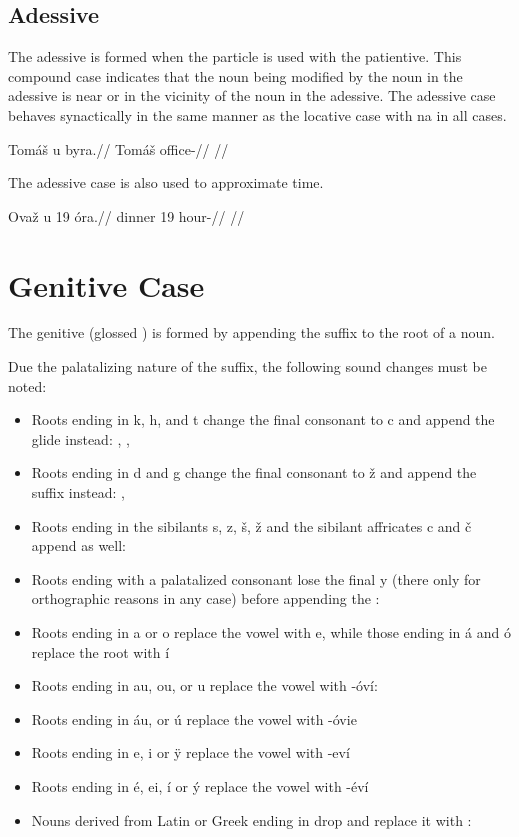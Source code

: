 \subsection{Adessive}
The adessive is formed when the particle  is used with the patientive. This compound case indicates that the noun being modified by the noun in the adessive is near or in the vicinity of the noun in the adessive. The adessive case behaves synactically in the same manner as the locative case with na in all cases.

\pex
\begingl
\gla Tom\'a\v{s} u byra.//
\glb Tom\'a\v{s}  office-//
\glft {}//
\endgl
\xe

The adessive case is also used to approximate time.

\pex
\begingl
\gla Ova\v{z} u 19 \'ora.//
\glb dinner  19 hour-//
\glft {}//
\endgl
\xe

\section{Genitive Case}

The genitive (glossed ) is formed by appending the suffix  to the root of a noun.

Due the palatalizing nature of the suffix, the following sound changes must be noted:

\begin{itemize}
	\item Roots ending in k, h, and t change the final consonant to c and append the glide  instead:  ,  ,  
	\item Roots ending in d and g change the final consonant to \v{z} and append the suffix  instead:  ,  
	\item Roots ending in the sibilants s, z, \v{s}, \v{z} and the sibilant affricates c and \v{c} append  as well:
	\item Roots ending with a palatalized consonant lose the final y (there only for orthographic reasons in any case) before appending the : 
	\item Roots ending in a or o replace the vowel with e, while those ending in \'a and \'o replace the root with \'i
	\item Roots ending in au, ou, or u replace the vowel with -\'ov\'i:  
	\item Roots ending in \'au, or \'u replace the vowel with -\'ovie
	\item Roots ending in e, i or \"y replace the vowel with -ev\'i
	\item Roots ending in \'e, ei, \'i or \'y replace the vowel with -\'ev\'i
  \item Nouns derived from Latin or Greek ending in  drop  and replace it with : 
\end{itemize}


